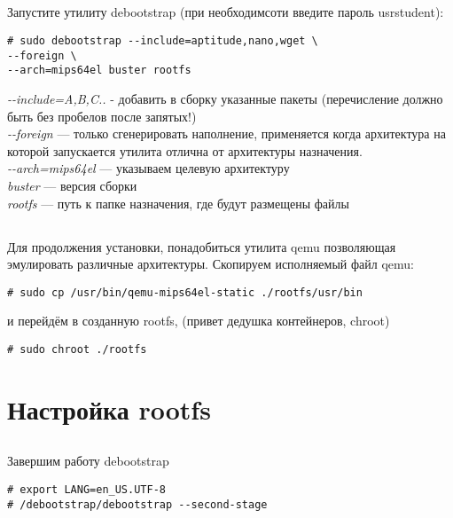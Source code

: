 \subsection{} Запустите утилиту debootstrap (при необходимсоти введите пароль usrstudent):
\begin{lstlisting}[style=bash]
# sudo debootstrap --include=aptitude,nano,wget \
--foreign \
--arch=mips64el buster rootfs
\end{lstlisting}
\textit{-{}-include=A,B,C..} - добавить в сборку указанные пакеты (перечисление должно быть без пробелов после запятых!)\\
\textit{-{}-foreign} — только сгенерировать наполнение, применяется когда архитектура на которой запускается утилита отлична от архитектуры назначения. \\
\textit{-{}-arch=mips64el} — указываем целевую архитектуру \\
\textit{buster} — версия сборки \\
\textit{rootfs} — путь к папке назначения, где будут размещены файлы \\

\subsection{} Для продолжения установки, понадобиться утилита qemu позволяющая эмулировать различные архитектуры. Скопируем исполняемый файл qemu:
\begin{lstlisting}[style=bash]
# sudo cp /usr/bin/qemu-mips64el-static ./rootfs/usr/bin
\end{lstlisting}
и перейдём в созданную rootfs, (привет дедушка контейнеров, chroot)
\begin{lstlisting}[style=bash]
# sudo chroot ./rootfs
\end{lstlisting}


\section{Настройка rootfs}

\subsection{} Завершим работу debootstrap
\begin{lstlisting}[style=bash]
# export LANG=en_US.UTF-8
# /debootstrap/debootstrap --second-stage
\end{lstlisting}

